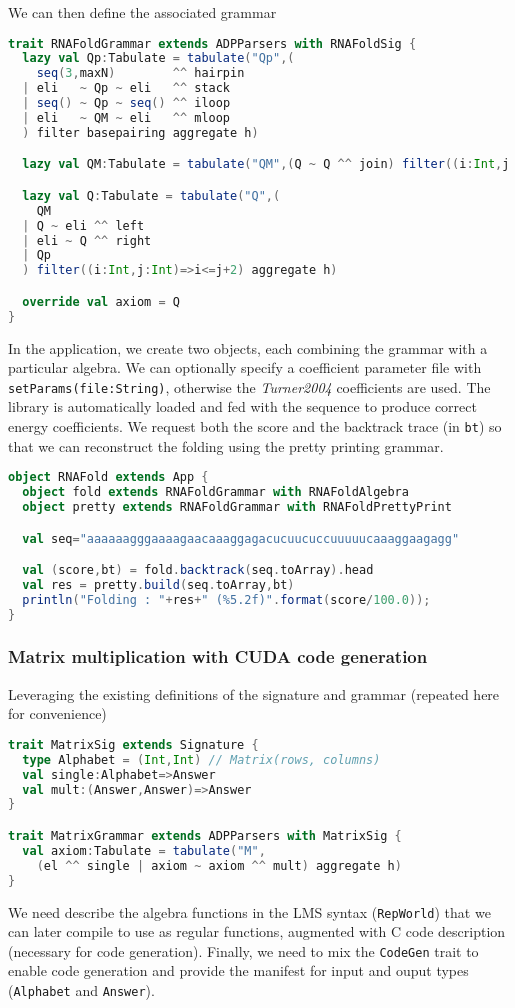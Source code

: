 \newpage
We can then define the associated grammar
\begin{lstlisting}[language=Scala,captionpos=none]
trait RNAFoldGrammar extends ADPParsers with RNAFoldSig {
  lazy val Qp:Tabulate = tabulate("Qp",(
    seq(3,maxN)        ^^ hairpin
  | eli   ~ Qp ~ eli   ^^ stack
  | seq() ~ Qp ~ seq() ^^ iloop
  | eli   ~ QM ~ eli   ^^ mloop
  ) filter basepairing aggregate h)

  lazy val QM:Tabulate = tabulate("QM",(Q ~ Q ^^ join) filter((i:Int,j:Int)=>i<=j+4) aggregate h)

  lazy val Q:Tabulate = tabulate("Q",(
    QM
  | Q ~ eli ^^ left
  | eli ~ Q ^^ right
  | Qp
  ) filter((i:Int,j:Int)=>i<=j+2) aggregate h)

  override val axiom = Q
}
\end{lstlisting}

In the application, we create two objects, each combining the grammar with a particular algebra. We can optionally specify a coefficient parameter file with {\tt setParams(file:String)}, otherwise the \textit{Turner2004} coefficients are used. The library is automatically loaded and fed with the sequence to produce correct energy coefficients. We request both the score and the backtrack trace (in {\tt bt}) so that we can reconstruct the folding using the pretty printing grammar.
\begin{lstlisting}[language=Scala,captionpos=none]
object RNAFold extends App {
  object fold extends RNAFoldGrammar with RNAFoldAlgebra
  object pretty extends RNAFoldGrammar with RNAFoldPrettyPrint

  val seq="aaaaaagggaaaagaacaaaggagacucuucuccuuuuucaaaggaagagg"

  val (score,bt) = fold.backtrack(seq.toArray).head
  val res = pretty.build(seq.toArray,bt)
  println("Folding : "+res+" (%5.2f)".format(score/100.0));
}
\end{lstlisting}

\newpage
\subsubsection{Matrix multiplication with CUDA code generation} \label{ex_matmult_cuda_lms}
Leveraging the existing definitions of the signature and grammar (repeated here for convenience)
\begin{lstlisting}[language=Scala,captionpos=none]
trait MatrixSig extends Signature {
  type Alphabet = (Int,Int) // Matrix(rows, columns)
  val single:Alphabet=>Answer
  val mult:(Answer,Answer)=>Answer
}

trait MatrixGrammar extends ADPParsers with MatrixSig {
  val axiom:Tabulate = tabulate("M",
    (el ^^ single | axiom ~ axiom ^^ mult) aggregate h)
}
\end{lstlisting}
We need describe the algebra functions in the LMS syntax ({\tt RepWorld}) that we can later compile to use as regular functions, augmented with C code description (necessary for code generation). Finally, we need to mix the {\tt CodeGen} trait to enable code generation and provide the manifest for input and ouput types ({\tt Alphabet} and {\tt Answer}).

